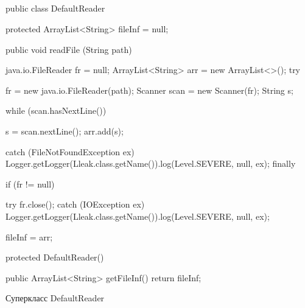 \documentclass[a4paper,12pt]{article}
\begin{document}

\renewcommand{\appendixpagename}{\centering Приложения}


\begin{appendices}
\renewcommand{\thesection}{\Asbuk{section}}
\makeatletter
\renewcommand{\theProgram}{\thesection.\@arabic\c@Program}
\renewcommand{\thefigure}{\thesection.\@arabic\c@figure}
\makeatother

\section{\centering } 
\setcounter{Program}{0}
\setcounter{figure}{0}

\begin{MyCode}[fontsize=\small]

public class DefaultReader {
	protected ArrayList<String> fileInf = null;
	
	
	public void readFile (String path) {
		java.io.FileReader fr = null;
		ArrayList<String> arr = new ArrayList<>();
		try {
			
			fr = new java.io.FileReader(path);
			Scanner scan = new Scanner(fr);
			String s;
			
			while (scan.hasNextLine()) {
				s = scan.nextLine();
				arr.add(s);
				
			}
		} catch (FileNotFoundException ex) {
			Logger.getLogger(Lleak.class.getName()).log(Level.SEVERE, null, ex);
		} 
		finally {
			if (fr != null) {
				try {
					fr.close();
				} catch (IOException ex) {
					Logger.getLogger(Lleak.class.getName()).log(Level.SEVERE, null, ex);
				}
				
			}
		}
		
		fileInf = arr;  
		
	}
	
	protected DefaultReader() {
	}
	
	public ArrayList<String> getFileInf() {
		return fileInf;
	}     
}

\end{MyCode}
\nopagebreak
\begin{Program}
	\caption{Суперкласс DefaultReader}\label{DefReader}
\end{Program}

\pagebreak




\end{appendices}
\end{document}
